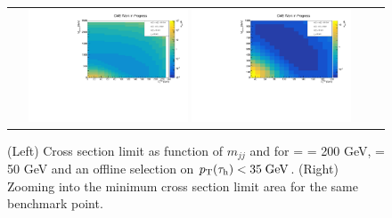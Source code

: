\begin{figure}[tbh!]
	\centering
	\begin{tabular}{cc}
		\includegraphics[width=0.45\textwidth]{analysis/pics/JetInvMass_vs_MET_xsec_chi200_lsp050_taupt35.pdf}
		\includegraphics[width=0.45\textwidth]{analysis/pics/JetInvMass_vs_MET_xsec_chi200_lsp050_taupt35_zoom.pdf}
	\end{tabular}
	\caption{(Left) Cross section limit as function of $m_{jj}$ and \met for \charginopm = \neutralinotwo = 200 GeV, \neutralinoone = 50 GeV and an offline selection on $p_{\text{T}}(\tau_{\text{h}}) <  35\;\text{Ge}\kern-0.06667em\text{V}$. (Right) Zooming into the minimum cross section limit area for the same benchmark point.}
	\label{fig::JetInvMass_vs_MET_xsec_chi200_lsp050_taupt35}
\end{figure}

